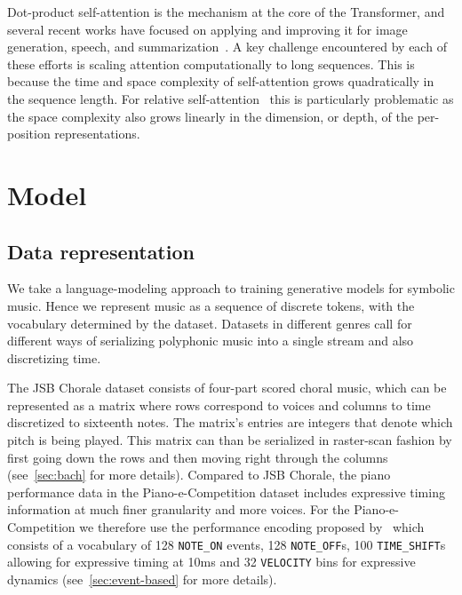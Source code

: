 \documentclass{article} \usepackage{iclr2019_conference,times}
\begin{document}
Dot-product self-attention is the mechanism at the core of the Transformer, and several recent works have focused on applying and improving it for image generation, speech, and summarization~\citep{parmar2018image,povey2018time,liu2018generatin}.
A key challenge encountered by each of these efforts is scaling attention computationally to long sequences. This is because the time and space complexity of self-attention grows quadratically in the sequence length. For relative self-attention~\citep{shaw2018self} this is particularly problematic as the space complexity also grows linearly in the dimension, or depth, of the per-position representations.










\section{Model}

\subsection{Data representation}
\label{sec:representation}
We take a language-modeling approach to training generative models for symbolic music.  Hence we represent music as a sequence of discrete tokens, with the vocabulary determined by the dataset.  Datasets in different genres call for different ways of serializing polyphonic music into a single stream and also discretizing time.

The JSB Chorale dataset consists of four-part scored choral music, which can be represented as a matrix where rows correspond to voices and columns to time discretized to sixteenth notes. The matrix's entries are integers that denote which pitch is being played.  This matrix can than be serialized in raster-scan fashion by first going down the rows and then moving right through the columns (see~\ref{sec:bach} for more details).
Compared to JSB Chorale, the piano performance data in the Piano-e-Competition dataset includes expressive timing information at much finer granularity and more voices.
For the Piano-e-Competition we therefore use the performance encoding proposed by~\citet{oore2018time} which consists of a vocabulary of 128 \texttt{NOTE\_ON} events, 128 \texttt{NOTE\_OFF}s, 100 \texttt{TIME\_SHIFT}s allowing for expressive timing at 10ms and 32 \texttt{VELOCITY} bins for expressive dynamics (see~\ref{sec:event-based} for more details).  
\end{document}
